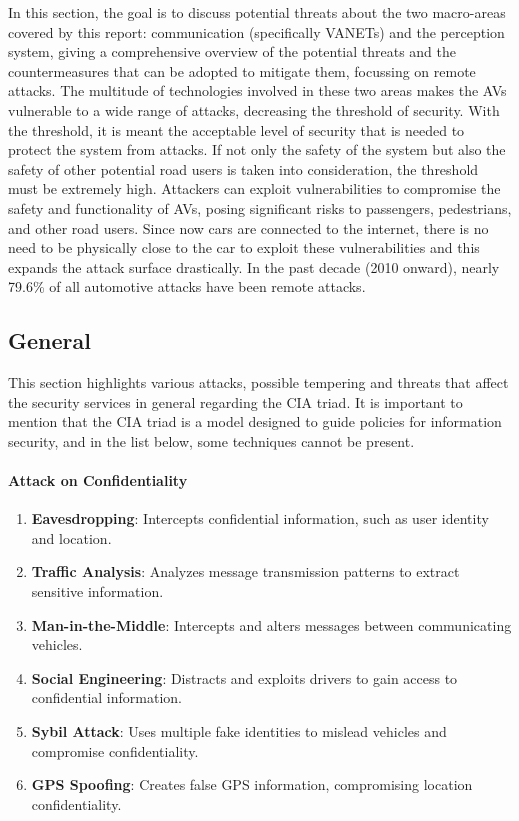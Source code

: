 In this section, the goal is to discuss potential threats about the two macro-areas covered by this report:
communication (specifically VANETs) and the perception system,
giving a comprehensive overview of the potential threats and the
countermeasures that can be adopted to mitigate them, focussing on remote attacks.
The multitude of technologies involved in these two areas makes the AVs vulnerable to a wide range of attacks,
decreasing the threshold of security.
With the threshold, it is meant the acceptable level of security that is needed to protect the system from attacks.
If not only the safety of the system but also the safety of other potential road users is taken into consideration,
the threshold must be extremely high.
Attackers can exploit vulnerabilities to compromise the safety and functionality of AVs,
posing significant risks to passengers, pedestrians, and other road users.
Since now cars are connected to the internet, there is no need to be physically close to the car to exploit these vulnerabilities and this expands the attack surface drastically.
In the past decade (2010 onward), nearly 79.6\% of all automotive attacks have been
remote attacks\cite{cybersec}.

\subsection{General}\label{subsec:communication-system}

This section highlights various attacks, possible tempering and threats that affect the security services in general regarding
the CIA triad.
It is important to mention that the CIA triad is a model designed to guide policies for information security, and in the list below, some techniques cannot be present.

\paragraph{Attack on Confidentiality}
\begin{enumerate}
    \item \textbf{Eavesdropping}: Intercepts confidential information, such as user identity and location.
    \item \textbf{Traffic Analysis}: Analyzes message transmission patterns to extract sensitive information.
    \item \textbf{Man-in-the-Middle}: Intercepts and alters messages between communicating vehicles.
    \item \textbf{Social Engineering}: Distracts and exploits drivers to gain access to confidential information.
    \item \textbf{Sybil Attack}: Uses multiple fake identities to mislead vehicles and compromise confidentiality.
    \item \textbf{GPS Spoofing}: Creates false GPS information, compromising location confidentiality.
\end{enumerate}

